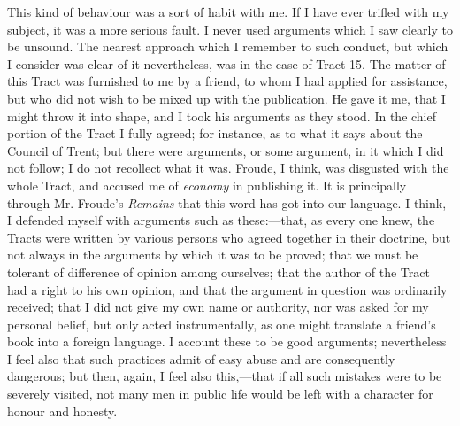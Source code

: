 This kind of behaviour was a sort of habit with me. If I have ever
trifled with my subject, it was a more serious fault. I never used
arguments which I saw clearly to be unsound. The nearest approach which
I remember to such conduct, but which I consider was clear of it
nevertheless, was in the case of Tract 15. The matter of this Tract was
furnished to me by a friend, to whom I had applied for
assistance, but who did not wish to be mixed up with the publication. He
gave it me, that I might throw it into shape, and I took his arguments
as they stood. In the chief portion of the Tract I fully agreed; for
instance, as to what it says about the Council of Trent; but there were
arguments, or some argument, in it which I did not follow; I do not
recollect what it was. Froude, I think, was disgusted with the whole
Tract, and accused me of \emph{economy} in publishing it. It is
principally through Mr. Froude's \emph{Remains} that this word has got into our
language. I think, I defended myself with arguments such as these:—that,
as every one knew, the Tracts were written by various persons who agreed
together in their doctrine, but not always in the arguments by which it
was to be proved; that we must be tolerant of difference of opinion
among ourselves; that the author of the Tract had a right to his own
opinion, and that the argument in question was ordinarily received; that
I did not give my own name or authority, nor was asked for my
personal belief, but only acted instrumentally, as one might translate a
friend's book into a foreign language. I account these to be good
arguments; nevertheless I feel also that such practices admit of easy
abuse and are consequently dangerous; but then, again, I feel also this,—that
if all such mistakes were to be severely visited, not many men in public
life would be left with a character for honour and honesty.

